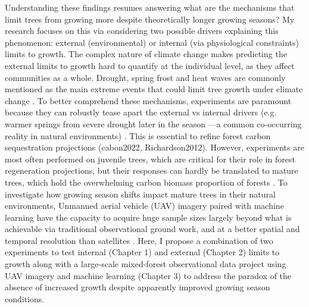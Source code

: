 \documentclass[12pt]{article}
\begin{document}
Understanding these findings resumes answering what are the mechanisms that limit trees from growing more despite theoretically longer growing seasons? My research focuses on this via considering two possible drivers explaining this phenomenon: external (environmental) \citep{kolar_response_2016} or internal (via physiological constraints)\citep{zohner_effect_2023} limits to growth. The complex nature of climate change makes predicting the external limits to growth hard to quantify at the individual level, as they affect communities as a whole. Drought, spring frost and heat waves are commonly mentioned as the main extreme events that could limit tree growth under climate change \citep{tyree_xylem_2002, choat_triggers_2018, li_widespread_2023, trenberth_global_2014,intergovernmental_panel_on_climate_change_detection_2014,chiang_evidence_2021,polgar_leafout_2011,reinmann_compensatory_2023}. To better comprehend these mechanisms, experiments are paramount because they can robustly tease apart the external vs internal drivers (e.g. warmer springs from severe drought later in the season ---a common co-occurring reality in natural environments) \citep{arft_responses_1999,morin_changes_2010,primack_observations_2015}. This is essential to refine forest carbon sequestration projections \citep{green_limits_2022}(cabon2022, Richardson2012). However, experiments are most often performed on juvenile trees, which are critical for their role in forest regeneration projections, but their responses can hardly be translated to mature trees, which hold the overwhelming carbon biomass proportion of forests \citep{augspurger_differences_2003,silvestro_longer_2023,vitasse_ontogenic_2013}. To investigate how growing season shifts impact mature trees in their natural environments, Unmanned aerial vehicle (UAV) imagery paired with machine learning have the capacity to acquire huge sample sizes largely beyond what is achievable via traditional observational ground work, and at a better spatial and temporal resolution than satellites \citep{berra_assessing_2019,piao_plant_2019,teng_bringing_2025}. Here, I propose a combination of two experiments to test internal (Chapter 1) and external (Chapter 2) limits to growth along with a large-scale mixed-forest observational data project using UAV imagery and machine learning (Chapter 3) to address the paradox of the absence of increased growth despite apparently improved growing season conditions. \\
\end{document}
